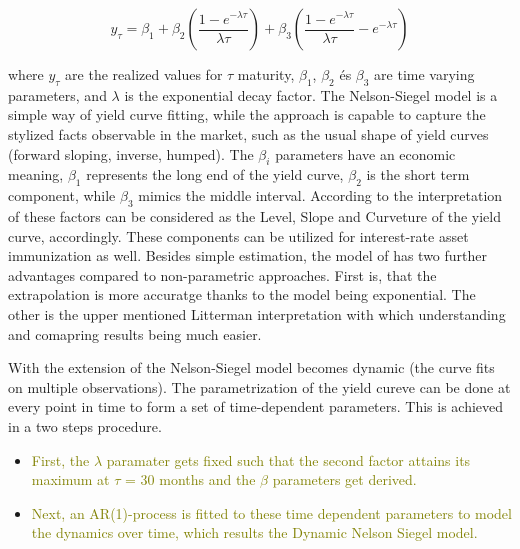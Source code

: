 \documentclass[12pt,bibliography=totoc]{article}
\begin{document}
\begin{equation}
y_{\tau}=\beta_{1}+\beta_{2}\left ( \frac{1-e^{-\lambda\tau}}{\lambda\tau} \right )+\beta_{3}\left ( \frac{1-e^{-\lambda\tau}}{\lambda\tau} -e^{-\lambda\tau}\right )
\end{equation}


where $y_{\tau}$ are the realized values for $\tau$ maturity, $\beta_{1}$, $\beta_{2}$ és $\beta_{3}$ are time varying parameters, and $\lambda$ is the exponential decay factor.
The Nelson-Siegel model is a simple way of yield curve fitting, while the approach is capable to capture the stylized facts observable in the market, such as the usual shape of yield curves (forward sloping, inverse, humped).
The $\beta_{i}$ parameters have an economic meaning, $\beta_{1}$ represents the long end of the yield curve,  $\beta_{2}$ is the short term component, while $\beta_{3}$ mimics the middle interval. According to the interpretation of \cite{litterman1991common} these factors can be considered as the Level, Slope and Curveture of the yield curve, accordingly. These components can be utilized for interest-rate asset immunization as well. Besides simple estimation, the model of \cite{diebold2006forecasting} has two further advantages compared to non-parametric approaches. First is, that the extrapolation is more accuratge thanks to the model being exponential. The other is the upper mentioned Litterman interpretation with which understanding and comapring results being much easier.
 
With the extension of \cite{diebold2006forecasting} the Nelson-Siegel model becomes dynamic (the curve fits on multiple observations). The parametrization of the yield cureve can be done at every point in time
to form a set of time-dependent parameters. This is achieved in a two steps procedure. 
\begin{itemize}
\item \textcolor{olive}{First, the $\lambda$  paramater gets fixed such that the second factor attains its maximum at $\tau$ = 30 months and the $\beta$ parameters get derived.}
\item \textcolor{olive}{Next, an AR(1)-process is fitted to these time dependent parameters to model the dynamics over time, which results the Dynamic Nelson Siegel model.}
\end{itemize}
\end{document}

